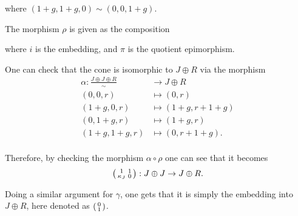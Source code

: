 \begin{example}
\begin{center}
	\end{center}
	where \( (1 + g, 1 + g, 0) \sim (0, 0, 1 + g) \).

	The morphism \( \rho \) is given as the composition
	\begin{center}
	\end{center}
	where \( i \) is the embedding, and \( \pi \) is the quotient epimorphism.

	One can check that the cone is isomorphic to \( J \oplus R \) via the morphism
	\begin{align*}
		\alpha: \frac{J \oplus J \oplus R}{\sim} &\to J \oplus R \\
		(0, 0, r) &\mapsto (0, r) \\
		(1 + g, 0, r) &\mapsto (1 + g, r + 1 + g) \\
		(0, 1 + g, r) &\mapsto (1 + g, r) \\
		(1 + g, 1 + g, r) &\mapsto (0, r + 1 + g). \\
	\end{align*}

	Therefore, by checking the morphism \( \alpha \circ \rho \) one can see that it becomes
	\[
		\begin{psmallmatrix}
			1 & 1 \\
			\kappa_J & 0 \\
		\end{psmallmatrix}:  J \oplus J \to J \oplus R.
	\]

	Doing a similar argument for \( \gamma \), one gets that it is simply the embedding into \( J \oplus R \), here denoted as \( \begin{psmallmatrix} 0 \\ 1 \\ \end{psmallmatrix} \).


\end{example}
